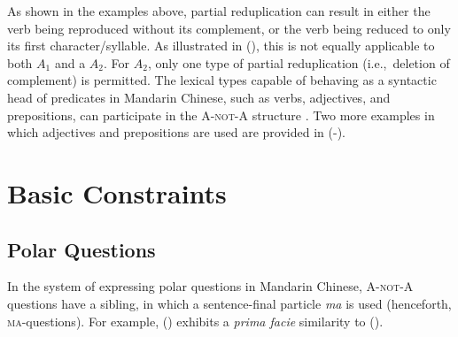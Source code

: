 \documentclass[11pt]{article}
\def\anota{\textsc{A-not-A}}
\def\aone{$A_1$}
\def\atwo{$A_2$}
\newcommand{\myref}[1]{(\getref{#1})}
\begin{document}
\noindent As shown in the examples above, partial reduplication can
result in either the verb being reproduced without its complement, or
the verb being reduced to only its first character/syllable.  As
illustrated in (), this is not
equally applicable to both {\aone} and a {\atwo}. For {\atwo}, only
one type of partial reduplication (i.e.,\ deletion of complement) is
permitted.  The lexical types capable of behaving as a syntactic head
of predicates in Mandarin Chinese, such as verbs, adjectives, and
prepositions, can participate in the {\anota} structure
\cite{tseng:09}. Two more examples in which adjectives and
prepositions are used are provided in
(-).


{\small 
{}}
\vspace{-20pt}





\section{Basic Constraints}
\label{sec:constraints}



\subsection{Polar Questions}
\label{ssec:polar}

In the system of expressing polar questions in Mandarin Chinese,
{\anota} questions have a sibling, in which a sentence-final particle
\textit{ma} is used (henceforth, \textsc{ma}-questions).  For example,
\myref{exe:yesno} exhibits a \textit{prima facie} similarity to
().

{\small 
{}}
\vspace{-20pt}
\end{document}
